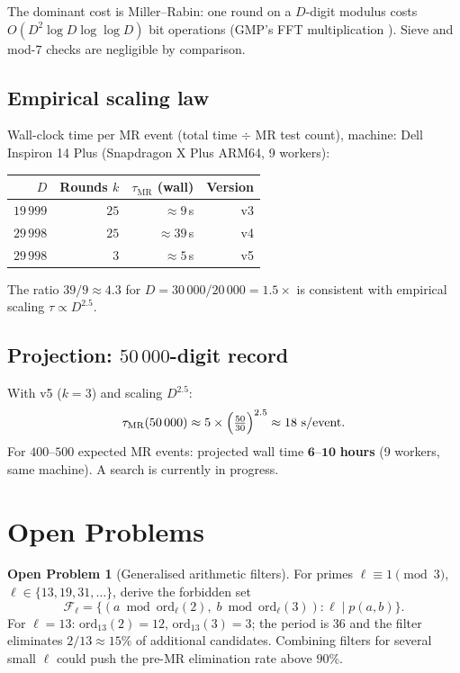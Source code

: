\documentclass[11pt,a4paper]{article}
\theoremstyle{definition}
\newtheorem{problem}[theorem]{Open Problem}
\theoremstyle{remark}
\newcommand{\F}{\mathcal{F}}
\begin{document}
The dominant cost is Miller--Rabin: one round on a $D$-digit modulus
costs $O(D^2\log D\log\log D)$ bit operations (GMP's FFT multiplication
\cite{GMP}). Sieve and mod-$7$ checks are negligible by comparison.

\subsection{Empirical scaling law}

Wall-clock time per MR event (total time $\div$ MR test count),
machine: Dell Inspiron 14 Plus (Snapdragon X Plus ARM64, 9 workers):

\begin{center}
\begin{tabular}{@{}rrrr@{}}
\toprule
$D$ & Rounds $k$ & $\tau_{\text{MR}}$ (wall) & Version \\
\midrule
$19\,999$ & $25$ & $\approx 9$\,s  & v3 \\
$29\,998$ & $25$ & $\approx 39$\,s & v4 \\
$29\,998$ & $3$  & $\approx 5$\,s  & v5 \\
\bottomrule
\end{tabular}
\end{center}

The ratio $39/9 \approx 4.3$ for $D = 30\,000/20\,000 = 1.5\times$
is consistent with empirical scaling $\tau \propto D^{2.5}$.

\subsection{Projection: $50\,000$-digit record}

With v5 ($k=3$) and scaling $D^{2.5}$:
\[
  \tau_{\text{MR}}(50\,000) \approx 5 \times\Bigl(\tfrac{50}{30}\Bigr)^{2.5}
  \approx 18\text{ s/event}.
\]
For $400$--$500$ expected MR events: projected wall time
$\mathbf{6}$--$\mathbf{10}$ \textbf{hours} (9 workers, same machine).
A search is currently in progress.

\section{Open Problems}\label{sec:open}

\begin{openprobbox}
\begin{problem}[Generalised arithmetic filters]\label{op:gen-filter}
For primes $\ell\equiv 1\pmod{3}$, $\ell\in\{13,19,31,\ldots\}$, derive
the forbidden set
\[
  \F_\ell = \bigl\{(a\bmod\mathrm{ord}_\ell(2),\;
                    b\bmod\mathrm{ord}_\ell(3)) : \ell\mid p(a,b)\bigr\}.
\]
For $\ell=13$: $\mathrm{ord}_{13}(2)=12$, $\mathrm{ord}_{13}(3)=3$;
the period is $36$ and the filter eliminates $2/13\approx 15\%$ of
additional candidates.
Combining filters for several small $\ell$ could push the pre-MR
elimination rate above $90\%$.
\end{problem}
\end{openprobbox}
\end{document}
